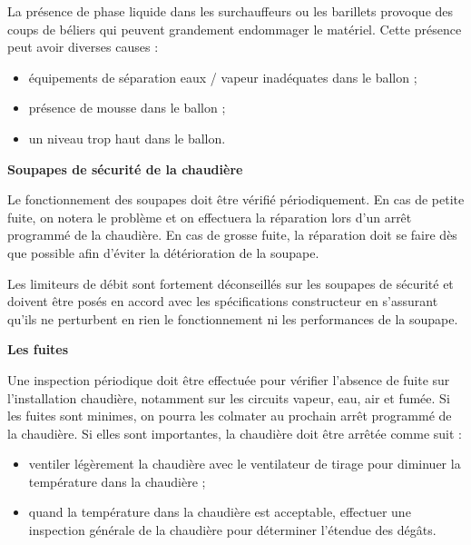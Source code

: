 La présence de phase liquide dans les surchauffeurs ou les barillets provoque des coups de béliers qui peuvent grandement endommager le matériel. Cette présence peut avoir diverses causes :

\begin{itemize}
\item équipements de séparation eaux / vapeur inadéquates dans le ballon ;
\item présence de mousse dans le ballon ;
\item  un niveau trop haut dans le ballon.

\end{itemize}

\vspace{0.3cm}
\textbf{Soupapes de sécurité de la chaudière}
\vspace{0.3cm}

Le fonctionnement des soupapes doit être vérifié périodiquement. 
En cas de petite fuite, on notera le problème et on effectuera la réparation lors d’un arrêt programmé de la chaudière. 
En cas de grosse fuite, la réparation doit se faire dès que possible afin d’éviter la détérioration de la soupape.
\vspace{0.3cm}

Les limiteurs de débit sont fortement déconseillés sur les soupapes de sécurité et doivent être posés en accord avec les spécifications constructeur en s’assurant qu’ils ne perturbent en rien le fonctionnement ni les performances de la soupape.


\vspace{0.3cm}
\textbf{Les fuites}
\vspace{0.3cm}

Une inspection périodique doit être effectuée pour vérifier l’absence de fuite sur l’installation chaudière, notamment sur les circuits vapeur, eau, air et fumée.
Si les fuites sont minimes, on pourra les colmater au prochain arrêt programmé de la chaudière.
Si elles sont importantes, la chaudière doit être arrêtée comme suit :


 \begin{itemize}
\item  ventiler légèrement la chaudière avec le ventilateur de tirage pour diminuer la température dans la chaudière ;
\item quand la température dans la chaudière est acceptable, effectuer une inspection générale de la chaudière pour déterminer l’étendue des dégâts.
\end{itemize}




